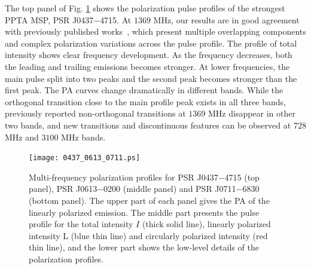 \documentclass[useAMS,usenatbib]{mn2e}
\begin{document}
The top panel of Fig. \ref{0437p} shows the polarization pulse profiles of the 
strongest PPTA MSP, PSR J0437$-$4715.
%
At $1369$ MHz, our results are in good agreement with previously published 
works~\citep{Johnston93,Manchester95_1,Navarro97,Yan11}, which present 
multiple overlapping components and complex polarization variations across 
the pulse profile. 
%
%
The profile of total intensity shows clear frequency development. As the 
frequency decreases, both the leading and trailing emissions becomes stronger.
%
At lower frequencies, the main pulse split into two peaks and the second peak
becomes stronger than the first peak.
%
The PA curves change dramatically in different bands. While the orthogonal 
transition close to the main profile peak exists in all three bands, previously
reported non-orthogonal transitions at $1369$ MHz disappear in other two bands,
and new transitions and discontinuous features can be observed at $728$ MHz 
and $3100$ MHz bands.
%


\begin{figure}
\begin{center}
\texttt{[image: 0437\_0613\_0711.ps]}
\caption{Multi-frequency polarization profiles for PSR J0437$-$4715 (top 
panel), PSR J0613$-$0200 (middle panel) and PSR J0711$-$6830 (bottom panel). 
The upper part of each panel gives the PA of the linearly polarized emission.
The middle part presents the pulse profile for the total intensity $I$ 
(thick solid line), linearly polarized intensity L (blue thin line) and 
circularly polarized intensity (red thin line), and the lower part shows 
the low-level details of the polarization profiles.}
\label{0437p}
\end{center}
\end{figure}
\end{document}
